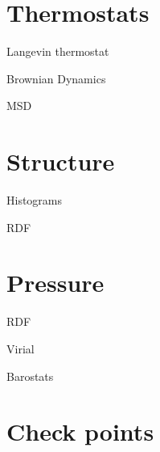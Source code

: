\section{Thermostats}

Langevin thermostat

Brownian Dynamics

MSD

\section{Structure}

Histograms

RDF

\section{Pressure}

RDF

Virial

Barostats

\section{Check points}

